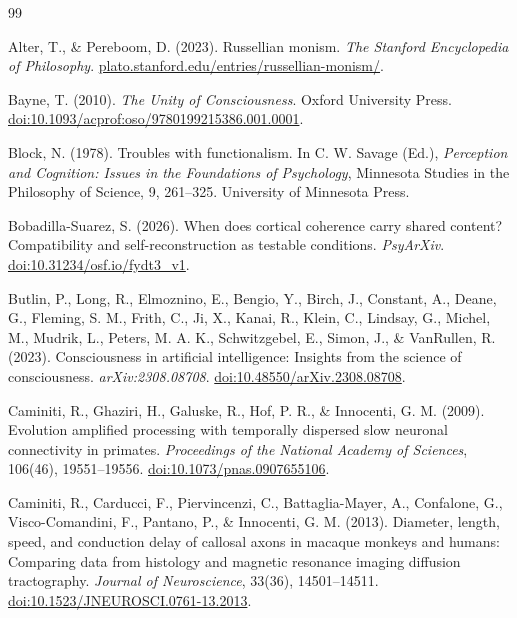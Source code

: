 \begin{thebibliography}{99}

 Alter, T., \& Pereboom, D. (2023). Russellian monism. \textit{The Stanford Encyclopedia of Philosophy}. \href{https://plato.stanford.edu/entries/russellian-monism/}{plato.stanford.edu/entries/russellian-monism/}.

 Bayne, T. (2010). \textit{The Unity of Consciousness}. Oxford University Press. \href{https://doi.org/10.1093/acprof:oso/9780199215386.001.0001}{doi:10.1093/acprof:oso/9780199215386.001.0001}.

 Block, N. (1978). Troubles with functionalism. In C. W. Savage (Ed.), \textit{Perception and Cognition: Issues in the Foundations of Psychology}, Minnesota Studies in the Philosophy of Science, 9, 261--325. University of Minnesota Press.

 Bobadilla-Suarez, S. (2026). When does cortical coherence carry shared content? Compatibility and self-reconstruction as testable conditions. \textit{PsyArXiv}. \href{https://doi.org/10.31234/osf.io/fydt3_v1}{doi:10.31234/osf.io/fydt3\_v1}.

 Butlin, P., Long, R., Elmoznino, E., Bengio, Y., Birch, J., Constant, A., Deane, G., Fleming, S. M., Frith, C., Ji, X., Kanai, R., Klein, C., Lindsay, G., Michel, M., Mudrik, L., Peters, M. A. K., Schwitzgebel, E., Simon, J., \& VanRullen, R. (2023). Consciousness in artificial intelligence: Insights from the science of consciousness. \textit{arXiv:2308.08708}. \href{https://doi.org/10.48550/arXiv.2308.08708}{doi:10.48550/arXiv.2308.08708}.

 Caminiti, R., Ghaziri, H., Galuske, R., Hof, P. R., \& Innocenti, G. M. (2009). Evolution amplified processing with temporally dispersed slow neuronal connectivity in primates. \textit{Proceedings of the National Academy of Sciences}, 106(46), 19551--19556. \href{https://doi.org/10.1073/pnas.0907655106}{doi:10.1073/pnas.0907655106}.

 Caminiti, R., Carducci, F., Piervincenzi, C., Battaglia-Mayer, A., Confalone, G., Visco-Comandini, F., Pantano, P., \& Innocenti, G. M. (2013). Diameter, length, speed, and conduction delay of callosal axons in macaque monkeys and humans: Comparing data from histology and magnetic resonance imaging diffusion tractography. \textit{Journal of Neuroscience}, 33(36), 14501--14511. \href{https://doi.org/10.1523/JNEUROSCI.0761-13.2013}{doi:10.1523/JNEUROSCI.0761-13.2013}.


\end{thebibliography}
